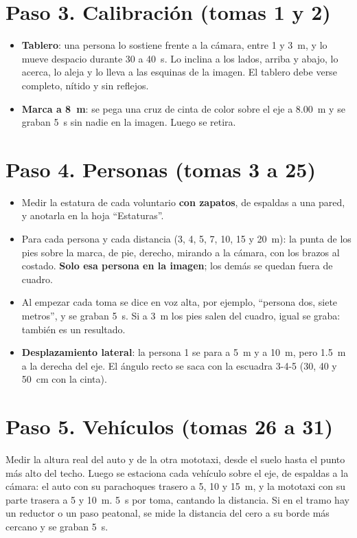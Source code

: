 \documentclass[10pt,a4paper]{article}
\begin{document}
\section*{Paso 3. Calibración (tomas 1 y 2)}
\begin{itemize}
  \item \textbf{Tablero}: una persona lo sostiene frente a la cámara, entre 1 y 3~m, y lo mueve despacio durante
        30 a 40~s. Lo inclina a los lados, arriba y abajo, lo acerca, lo aleja y lo lleva a las esquinas de la
        imagen. El tablero debe verse completo, nítido y sin reflejos.
  \item \textbf{Marca a 8~m}: se pega una cruz de cinta de color sobre el eje a 8.00~m y se graban 5~s sin nadie
        en la imagen. Luego se retira.
\end{itemize}

\section*{Paso 4. Personas (tomas 3 a 25)}
\begin{itemize}
  \item Medir la estatura de cada voluntario \textbf{con zapatos}, de espaldas a una pared, y anotarla en la
        hoja ``Estaturas''.
  \item Para cada persona y cada distancia (3, 4, 5, 7, 10, 15 y 20~m): la punta de los pies sobre la marca, de
        pie, derecho, mirando a la cámara, con los brazos al costado. \textbf{Solo esa persona en la imagen}; los
        demás se quedan fuera de cuadro.
  \item Al empezar cada toma se dice en voz alta, por ejemplo, ``persona dos, siete metros'', y se graban 5~s.
        Si a 3~m los pies salen del cuadro, igual se graba: también es un resultado.
  \item \textbf{Desplazamiento lateral}: la persona 1 se para a 5~m y a 10~m, pero 1.5~m a la derecha del eje.
        El ángulo recto se saca con la escuadra 3-4-5 (30, 40 y 50~cm con la cinta).
\end{itemize}

\section*{Paso 5. Vehículos (tomas 26 a 31)}
Medir la altura real del auto y de la otra mototaxi, desde el suelo hasta el punto más alto del techo. Luego se
estaciona cada vehículo sobre el eje, de espaldas a la cámara: el auto con su parachoques trasero a 5, 10 y 15~m,
y la mototaxi con su parte trasera a 5 y 10~m. 5~s por toma, cantando la distancia. Si en el tramo hay un reductor
o un paso peatonal, se mide la distancia del cero a su borde más cercano y se graban 5~s.
\end{document}

